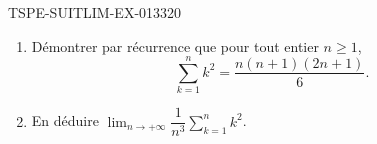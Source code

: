 \begin{exercice}{TSPE-SUITLIM-EX-013}{3}{20}
\begin{enumerate}
  \item Démontrer par récurrence que pour tout entier $n \geq 1$,
    \[
      \sum_{k=1}^{n} k^2 = \frac{n(n+1)(2n+1)}{6}.
    \]
  \item En déduire $\lim_{n \to +\infty} \dfrac{1}{n^3}\sum_{k=1}^{n} k^2$.
\end{enumerate}
\end{exercice}
